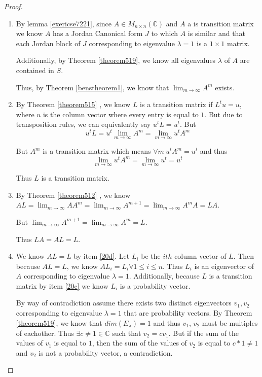 \documentclass{amsart}
\theoremstyle{definition}
\theoremstyle{remark}
\numberwithin{equation}{section}
\begin{document}
\begin{proof} \leavevmode

\begin{enumerate}

	\item \label{20b}

		By lemma \ref{exericse7221}, since $A \in M_{n \times n}(\mathbb{C})$ and $A$ a is transition matrix we know $A$ has a Jordan Canonical form $J$ to which $A$ is similar and that each Jordan block of $J$ corresponding to eigenvalue $\lambda = 1$ is a $1 \times 1$ matrix.

		Additionally, by Theorem \ref{theorem519}, we know all eigenvalues $\lambda$ of $A$ are contained in $S$.

		Thus, by Theorem \ref{benstheorem1}, we know that $\lim_{m \to \infty} A^m$ exists.
	
			

	\item \label{20c}{}
			By Theorem \ref{theorem515} , we know $L$ is a transition matrix if $L^tu = u$, where $u$ is the column vector where every entry is equal to $1$.
			But due to transposition rules, we can equivalently say  $u^tL = u^t$.
			But 
			$$u^tL = u^t \lim_{m \to \infty} A^m = \lim_{m \to \infty} u^t A^m$$

			But $A^m$ is a transition matrix which means $\forall m\ u^t A^m = u^t$ and thus
			$$\lim_{m \to \infty} u^t A^m = \lim_{m \to \infty} u^t = u^t $$

			Thus $L$ is a transition matrix.


	\item \label{20d}

			By Theorem \ref{theorem512} \cite{friedberg2003linear}, we know $AL = \lim_{m \to \infty} A A^m = \lim_{m \to \infty} A^{m+1} = \lim_{m \to \infty} A^mA  = LA$.

			But $\lim_{m \to \infty} A^{m+1} = \lim_{m \to \infty} A^{m} = L$.

			Thus $LA = AL = L$.


	\item \label{20e}

			We know $AL = L$ by item \ref{20d}.
			Let $L_i$ be the $ith$ column vector of $L$.
			Then because $AL = L$, we know $AL_i = L_i \forall 1 \leq i \leq n$.
			Thus $L_i$ is an eigenvector of $A$ corresponding to eigenvalue $\lambda = 1$.
			Additionally, because $L$ is a transition matrix by item \ref{20c} we know $L_i$ is a probability vector.

			By way of contradiction assume there exists two distinct eigenvectors $v_1, v_2$ corresponding to eigenvalue $\lambda = 1$ that are probability vectors.
			By Theorem \ref{theorem519}, we know that $dim(E_{\lambda}) =1$ and thus $v_1$, $v_2$ must be multiples of eachother.
			Thus $\exists c \neq 1 \in \mathbb{C}$ such that $v_2 = cv_1$.
			But if the sum of the values of $v_1$ is equal to $1$, then the sum of the values of $v_2$ is equal to $c* 1 \neq 1$ and $v_2$ is not a probability vector, a contradiction.


\end{enumerate}
\end{proof}
\end{document}
